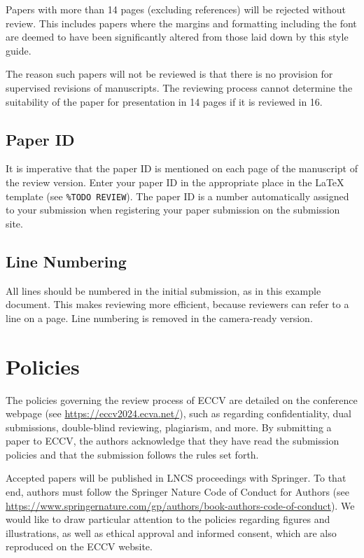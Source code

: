 \documentclass[runningheads]{eccv/llncs}
\begin{document}
Papers with more than 14 pages (excluding references) will be rejected without review.
This includes papers where the margins and formatting including the font are deemed to have been significantly altered from those laid down by this style guide.

The reason such papers will not be reviewed is that there is no provision for supervised revisions of manuscripts. 
The reviewing process cannot determine the suitability of the paper for presentation in 14 pages if it is reviewed in 16.


\subsection{Paper ID}
It is imperative that the paper ID is mentioned on each page of the manuscript of the review version.
Enter your paper ID in the appropriate place in the \LaTeX{} template (see \texttt{\%TODO REVIEW}).
The paper ID is a number automatically assigned to your submission when registering your paper submission on the submission site.


\subsection{Line Numbering}
\label{sec:line-numbering}
All lines should be numbered in the initial submission, as in this example document. 
This makes reviewing more efficient, because reviewers can refer to a line on a page. 
Line numbering is removed in the camera-ready version.



\section{Policies}
The policies governing the review process of ECCV \ECCVyear{} are detailed on the conference webpage (see \url{https://eccv2024.ecva.net/}), such as regarding confidentiality, dual submissions, double-blind reviewing, plagiarism, and more. 
By submitting a paper to ECCV, the authors acknowledge that they have read the submission policies and that the submission follows the rules set forth.

Accepted papers will be published in LNCS proceedings with Springer.
To that end, authors must follow the Springer Nature Code of Conduct for Authors (see \url{https://www.springernature.com/gp/authors/book-authors-code-of-conduct}).
We would like to draw particular attention to the policies regarding figures and illustrations, as well as ethical approval and informed consent, which are also reproduced on the ECCV website.
\end{document}
